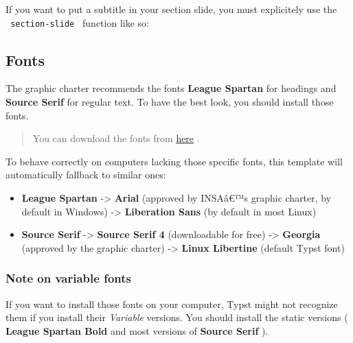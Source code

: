 If you want to put a subtitle in your section slide, you must
explicitely use the \texttt{\ section-slide\ } function like so:

\begin{Shaded}
\begin{Highlighting}[]
\end{Highlighting}
\end{Shaded}

\subsection{Fonts}\label{fonts}

The graphic charter recommends the fonts \textbf{League Spartan} for
headings and \textbf{Source Serif} for regular text. To have the best
look, you should install those fonts.

\begin{quote}
You can download the fonts from
\href{https://github.com/SkytAsul/INSA-Typst-Template/tree/main/fonts}{here}
.
\end{quote}

To behave correctly on computers lacking those specific fonts, this
template will automatically fallback to similar ones:

\begin{itemize}
\tightlist
\item
  \textbf{League Spartan} -\textgreater{} \textbf{Arial} (approved by
  INSAâ€™s graphic charter, by default in Windows) -\textgreater{}
  \textbf{Liberation Sans} (by default in most Linux)
\item
  \textbf{Source Serif} -\textgreater{} \textbf{Source Serif 4}
  (downloadable for free) -\textgreater{} \textbf{Georgia} (approved by
  the graphic charter) -\textgreater{} \textbf{Linux Libertine} (default
  Typst font)
\end{itemize}

\subsubsection{Note on variable fonts}\label{note-on-variable-fonts}

If you want to install those fonts on your computer, Typst might not
recognize them if you install their \emph{Variable} versions. You should
install the static versions ( \textbf{League Spartan Bold} and most
versions of \textbf{Source Serif} ).

